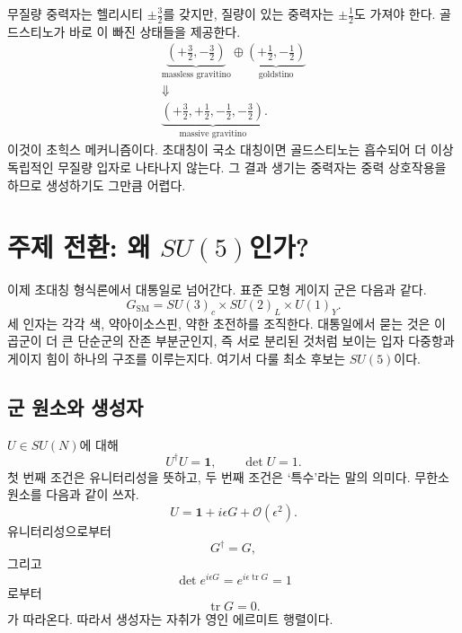 무질량 중력자는 헬리시티 \(\pm\tfrac32\)를 갖지만, 질량이 있는 중력자는 \(\pm\tfrac12\)도 가져야 한다. 골드스티노가 바로 이 빠진 상태들을 제공한다.
\begin{equation}
\begin{gathered}
\underbrace{\left(+\frac32,-\frac32\right)}_{\text{massless gravitino}}
\oplus
\underbrace{\left(+\frac12,-\frac12\right)}_{\text{goldstino}}\\
\Downarrow\\
\underbrace{\left(+\frac32,+\frac12,-\frac12,-\frac32\right)}_{\text{massive gravitino}}.
\end{gathered}
\label{eq:l9-super-higgs}
\end{equation}
이것이 초힉스 메커니즘이다. 초대칭이 국소 대칭이면 골드스티노는 흡수되어 더 이상 독립적인 무질량 입자로 나타나지 않는다. 그 결과 생기는 중력자는 중력 상호작용을 하므로 생성하기도 그만큼 어렵다.

\section{주제 전환: 왜 \texorpdfstring{\(SU(5)\)}{SU(5)}인가?}

이제 초대칭 형식론에서 대통일로 넘어간다. 표준 모형 게이지 군은 다음과 같다.
\begin{equation}
G_{\mathrm{SM}}
=SU(3)_c\times SU(2)_L\times U(1)_Y.
\label{eq:l9-sm-group}
\end{equation}
세 인자는 각각 색, 약아이소스핀, 약한 초전하를 조직한다. 대통일에서 묻는 것은 이 곱군이 더 큰 단순군의 잔존 부분군인지, 즉 서로 분리된 것처럼 보이는 입자 다중항과 게이지 힘이 하나의 구조를 이루는지다. 여기서 다룰 최소 후보는 \(SU(5)\)이다.

\subsection{군 원소와 생성자}

\(U\in SU(N)\)에 대해
\begin{equation}
U^\dagger U=\mathbf1,
\qquad
\det U=1.
\label{eq:l9-SUN-def}
\end{equation}
첫 번째 조건은 유니터리성을 뜻하고, 두 번째 조건은 ‘특수’라는 말의 의미다. 무한소 원소를 다음과 같이 쓰자.
\begin{equation}
U=\mathbf1+i\epsilon G+\mathcal O(\epsilon^2).
\label{eq:l9-infinitesimal-U}
\end{equation}
유니터리성으로부터
\begin{equation}
G^\dagger=G,
\end{equation}
그리고
\begin{equation}
\det e^{i\epsilon G}
=e^{i\epsilon\operatorname{tr}G}=1
\end{equation}
로부터
\begin{equation}
\operatorname{tr}G=0.
\end{equation}
가 따라온다. 따라서 생성자는 자취가 영인 에르미트 행렬이다.

